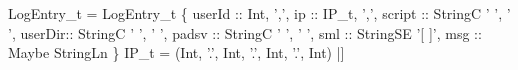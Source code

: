 \begin{code}

   LogEntry_t = LogEntry_t \{
    userId :: Int,         ',',   
    ip     :: IP_t,        ',',   
    script :: StringC ' ', ' ',   
    userDir:: StringC ' ', ' ',   
    padsv  :: StringC ' ', ' ',   
    sml    :: StringSE '[ ]',     
    msg    :: Maybe StringLn      
  \}
\mbox{}
   IP_t = (Int, '.', Int, '.', Int, '.', Int)
|]
\end{code}

\begin{code}



\end{code}
